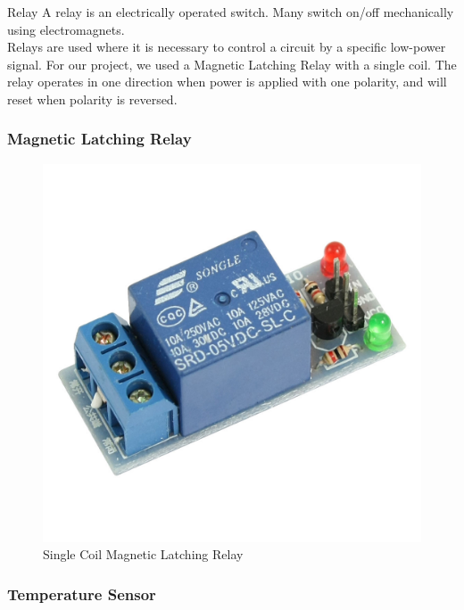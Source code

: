 \documentclass[10pt]{beamer}
\begin{document}
{
	\begin{frame}{Relay}
		A relay is an electrically operated switch. Many switch on/off mechanically using electromagnets.   \\
		\vspace{5mm}
		Relays are used where it is necessary to control a circuit by a specific low-power signal. For our project, we used a Magnetic Latching Relay with a single coil. The relay operates in one direction when power is applied with one polarity, and will reset when polarity is reversed. 
	\end{frame}
}
{
	\begin{frame}
		\frametitle{Magnetic Latching Relay}
		\begin{figure}
			\includegraphics[scale=0.15]{relay}
			\caption{Single Coil Magnetic Latching Relay}
		\end{figure}
	\end{frame}
{
	\begin{frame}
		\frametitle{Temperature Sensor}
		\begin{figure}[h!]

\end{figure}
\end{frame}}}
\end{document}

